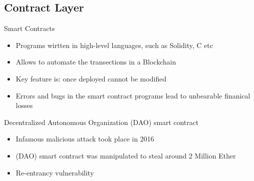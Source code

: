\documentclass[aspectratio=169]{beamer}
\begin{document}
\subsection{Contract Layer}
\begin{frame}{Smart Contracts}

 \begin{itemize}
\item Programs wirtten in high-level languages, such as Solidity, C etc
\item Allows to automate the transections in a Blockchain
\item Key feature is: once deployed cannot be modified
\item Errors and bugs in the smart contract programs lead to unbearable finanical losses
\end{itemize}


		
\end{frame}


\begin{frame}{Decentralized Autonomous Organization (DAO) smart contract}

 \begin{itemize}
\item Infamous malicious attack took place in 2016 
\item (DAO) smart contract was manipulated to steal around 2 Million Ether
\item Re-entrancy vulnerability
\end{itemize}
\end{frame}
\end{document}
